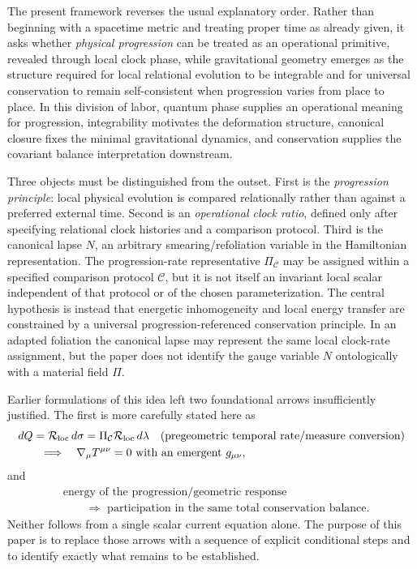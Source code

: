 \documentclass[11pt]{article}
\begin{document}
The present framework reverses the usual explanatory order. Rather than beginning with a spacetime metric and treating proper time as already given, it asks whether \emph{physical progression} can be treated as an operational primitive, revealed through local clock phase, while gravitational geometry emerges as the structure required for local relational evolution to be integrable and for universal conservation to remain self-consistent when progression varies from place to place. In this division of labor, quantum phase supplies an operational meaning for progression, integrability motivates the deformation structure, canonical closure fixes the minimal gravitational dynamics, and conservation supplies the covariant balance interpretation downstream.

Three objects must be distinguished from the outset. First is the \emph{progression principle}: local physical evolution is compared relationally rather than against a preferred external time. Second is an \emph{operational clock ratio}, defined only after specifying relational clock histories and a comparison protocol. Third is the canonical lapse $N$, an arbitrary smearing/refoliation variable in the Hamiltonian representation. The progression-rate representative $\Pi_{\mathcal C}$ may be assigned within a specified comparison protocol $\mathcal C$, but it is not itself an invariant local scalar independent of that protocol or of the chosen parameterization. The central hypothesis is instead that energetic inhomogeneity and local energy transfer are constrained by a universal progression-referenced conservation principle. In an adapted foliation the canonical lapse may represent the same local clock-rate assignment, but the paper does not identify the gauge variable $N$ ontologically with a material field $\Pi$.

Earlier formulations of this idea left two foundational arrows insufficiently justified. The first is more carefully stated here as
\begin{equation}
\begin{aligned}
    &dQ=\mathcal R_{\rm loc}\,d\sigma
      =\Pi_{\mathcal C}\mathcal R_{\rm loc}\,d\lambda
      \quad\text{(pregeometric temporal rate/measure conversion)}\\
    &\qquad\Longrightarrow\quad
      \nabla_\mu T^{\mu\nu}=0
      \ \text{with an emergent }g_{\mu\nu},
\end{aligned}
    \label{eq:first_arrow}
\end{equation}
and
\begin{equation}
\begin{aligned}
    &\text{energy of the progression/geometric response}\\
    &\qquad\Longrightarrow
    \text{ participation in the same total conservation balance}.
\end{aligned}
\label{eq:second_arrow}
\end{equation}
Neither follows from a single scalar current equation alone. The purpose of this paper is to replace those arrows with a sequence of explicit conditional steps and to identify exactly what remains to be established.
\end{document}

